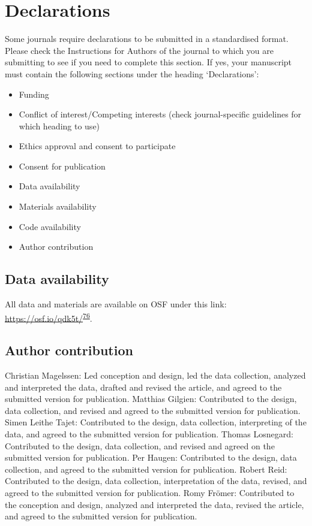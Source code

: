 \documentclass[pdflatex,sn-nature]{sn-jnl}%
\theoremstyle{thmstyleone}%
\theoremstyle{thmstyletwo}%
\theoremstyle{thmstylethree}%
\begin{document}
\section*{Declarations}

Some journals require declarations to be submitted in a standardised format. Please check the Instructions for Authors of the journal to which you are submitting to see if you need to complete this section. If yes, your manuscript must contain the following sections under the heading `Declarations':

\begin{itemize}
\item Funding
\item Conflict of interest/Competing interests (check journal-specific guidelines for which heading to use)
\item Ethics approval and consent to participate
\item Consent for publication
\item Data availability 
\item Materials availability
\item Code availability 
\item Author contribution
\end{itemize}

\subsection{Data availability}
All data and materials are available on OSF under this link: \href{https://osf.io/qdk5t/}{https://osf.io/qdk5t/}\textsuperscript{\href{https://www.nature.com/articles/s44271-024-00055-y\#ref-CR76}{76}}. 

\subsection{Author contribution}
Christian Magelssen: Led conception and design, led the data collection, analyzed and interpreted the data, drafted and revised the article, and agreed to the submitted version for publication. Matthias Gilgien: Contributed to the design, data collection, and revised and agreed to the submitted version for publication. Simen Leithe Tajet: Contributed to the design, data collection, interpreting of the data, and agreed to the submitted version for publication. Thomas Losnegard: Contributed to the design, data collection, and revised and agreed on the submitted version for publication. Per Haugen: Contributed to the design, data collection, and agreed to the submitted version for publication. Robert Reid: Contributed to the design, data collection, interpretation of the data, revised, and agreed to the submitted version for publication. Romy Frömer: Contributed to the conception and design, analyzed and interpreted the data, revised the article, and agreed to the submitted version for publication.
\end{document}
